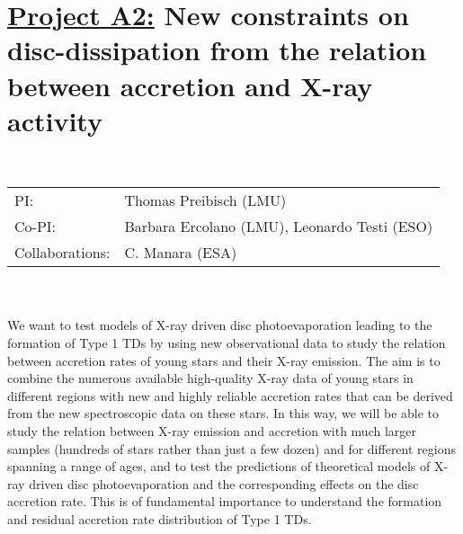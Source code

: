 \def\remove#1{}


\pagebreak[4]

\section*{\underline{Project A2:} 
New constraints on disc-dissipation from the
relation between accretion and  X-ray activity}

\\
\begin{tabular}{ll}
{\textsf{PI:}}                     & Thomas Preibisch (LMU)\\
{\textsf{Co-PI:}}               & Barbara Ercolano (LMU), Leonardo Testi (ESO)\\
{\textsf{Collaborations:}}      & C. Manara (ESA)\\

\end{tabular}

 \\

\\
We want to test models of X-ray driven disc photoevaporation leading
to the formation of Type 1 TDs by using
new observational data to study the relation between accretion rates of young stars and
their X-ray emission.
The aim is to combine
the numerous available high-quality
X-ray data of young stars  in different regions with new and highly reliable 
accretion rates that can be derived from the new spectroscopic data on these stars.
In this way, we will be able to study the relation between X-ray emission
and accretion with much larger samples (hundreds of stars rather
than just a few dozen) and for different regions spanning a range
of ages, and to test the predictions of theoretical models of
X-ray driven disc photoevaporation and the corresponding effects on
the disc accretion rate. This is of fundamental importance to
understand the formation and residual accretion rate distribution of
Type 1 TDs. 

